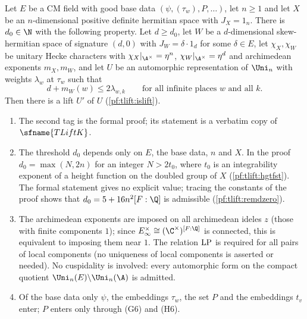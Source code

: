 \begin{theorem}\label{pf:tlift:main}
Let $E$ be a CM field with good base data $(\psi,(\tau_w),P,\dots)$, let $n\ge1$ and let $X$ be an
$n$-dimensional positive definite hermitian space with $J_X=1_n$. There is $d_0\in\N$ with the following
property. Let $d\ge d_0$, let $W$ be a $d$-dimensional skew-hermitian space of signature $(d,0)$ with
$J_W=\delta\cdot1_d$ for some $\delta\in E$, let $\chi_X,\chi_W$ be unitary Hecke characters with
$\chi_X|_{\A^\times}=\eta^n$, $\chi_W|_{\A^\times}=\eta^d$ and archimedean exponents $m_X,m_W$, and let $U$ be
an automorphic representation of $\Uni_n$ with weights $\lambda_w$ at $\tau_w$ such that
\begin{equation}\label{eq:tlift:dom}
  d+m_W(w)\le2\lambda_{w,k}\qquad\text{for all infinite places $w$ and all $k$.}
\end{equation}
Then there is a lift $U'$ of $U$ (\cref{pf:tlift:islift}).
\end{theorem}

\begin{remark}\label{pf:tlift:remstmt}
\begin{enumerate}[label=(\alph*),nosep]
\item The second tag is the formal proof; its statement is a verbatim copy of $\sfname{TLiftK}$.
\item The threshold $d_0$ depends only on $E$, the base data, $n$ and $X$. In the proof
  $d_0=\max(N,2n)$ for an integer $N>2t_0$, where $t_0$ is an integrability exponent of a height function
  on the doubled group of $X$ (\cref{pf:tlift:hgtfst}). The formal statement gives no explicit value; tracing the
  constants of the proof shows that $d_0=5+16n^2[F:\Q]$ is admissible (\cref{pf:tlift:remdzero}).
\item The archimedean exponents are imposed on all archimedean ideles $z$ (those with finite components $1$);
  since $E_\infty^\times\cong(\C^\times)^{[F:\Q]}$ is connected, this is equivalent to imposing them near $1$. The relation
  $\mathrm{LP}$ is required for all pairs of local components (no uniqueness of local components is
  asserted or needed). No cuspidality is involved: every automorphic form on the compact quotient
  $\Uni_n(E)\backslash\Uni_n(\A)$ is admitted.
\item Of the base data only $\psi$, the embeddings $\tau_w$, the set $P$ and the embeddings $t_v$ enter;
  $P$ enters only through (G6) and (H6).
\end{enumerate}
\end{remark}


